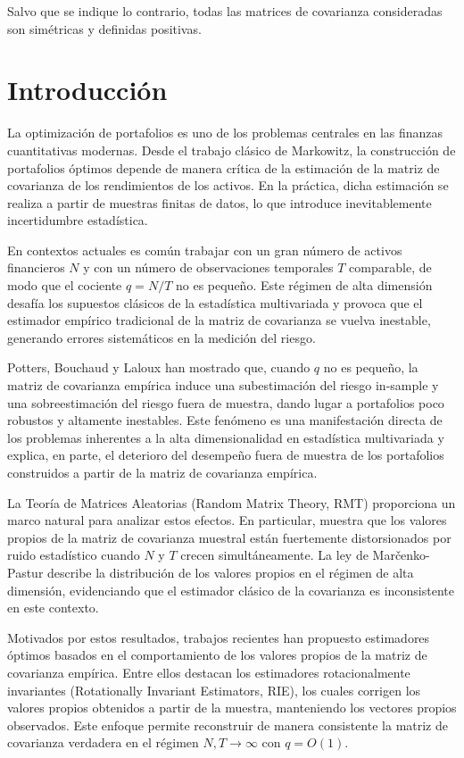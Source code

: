 \documentclass[letterpaper,12pt,oneside]{book}
\begin{document}
Salvo que se indique lo contrario, todas las matrices de covarianza consideradas son simétricas y definidas positivas.

\chapter{Introducción}

La optimización de portafolios es uno de los problemas centrales en las finanzas cuantitativas modernas.
Desde el trabajo clásico de Markowitz, la construcción de portafolios óptimos depende de manera
crítica de la estimación de la matriz de covarianza de los rendimientos de los activos. En la práctica,
dicha estimación se realiza a partir de muestras finitas de datos, lo que introduce inevitablemente
incertidumbre estadística.

En contextos actuales es común trabajar con un gran número de activos financieros $N$ y con un número de observaciones temporales $T$ comparable, de modo que el cociente $q = N/T$ no es pequeño.
Este régimen de alta dimensión desafía los supuestos clásicos de la estadística multivariada y provoca que el estimador empírico tradicional de la matriz de covarianza se vuelva inestable, generando errores
sistemáticos en la medición del riesgo.

Potters, Bouchaud y Laloux han mostrado que, cuando $q$ no es pequeño, la matriz de covarianza empírica induce una subestimación del riesgo in-sample y una sobreestimación del riesgo fuera de muestra, dando lugar a portafolios poco robustos y altamente inestables. Este fenómeno es una manifestación directa de los problemas inherentes a la alta dimensionalidad en estadística multivariada y explica, en parte, el deterioro del desempeño fuera de muestra de los portafolios construidos a partir de la matriz de covarianza empírica.

La Teoría de Matrices Aleatorias (Random Matrix Theory, RMT) proporciona un marco natural para analizar estos efectos. En particular, muestra que los valores propios de la matriz de covarianza muestral están fuertemente distorsionados por ruido estadístico cuando $N$ y $T$ crecen simultáneamente. La ley de Marčenko-Pastur describe la distribución de los valores propios en el régimen de alta dimensión, evidenciando que el estimador clásico de la covarianza es inconsistente en este contexto.

Motivados por estos resultados, trabajos recientes han propuesto estimadores óptimos basados en el comportamiento de los valores propios de la matriz de covarianza empírica. Entre ellos destacan los estimadores rotacionalmente invariantes (Rotationally Invariant Estimators, RIE), los cuales corrigen los valores propios obtenidos a partir de la muestra, manteniendo los vectores propios observados. Este enfoque permite reconstruir de manera consistente la matriz de covarianza verdadera en el régimen $N, T \to \infty$ con $q = O(1)$.
\end{document}
